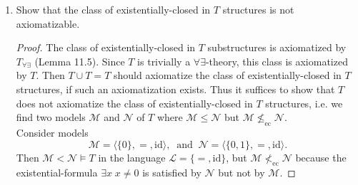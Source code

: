 \documentclass{article}
\begin{document}
\begin{enumerate}[label={\bf Q\arabic*:}]
\begin{enumerate}
      \item Show that the class of existentially-closed in $T$ structures
        is not axiomatizable.
        \begin{proof}
          The class of existentially-closed in $T$ substructures is
          axiomatized by $T_{\forall\exists}$ (Lemma 11.5). Since $T$ is
          trivially a $\forall\exists$-theory, this class is axiomatized by
          $T$. Then $T\cup T=T$ should axiomatize the class of
          existentially-closed in $T$ structures, if such an axiomatization
          exists. Thus it suffices to show that $T$ does not axiomatize the
          class of existentially-closed in $T$ structures, i.e. we find two
          models $\mathcal{M}$ and $\mathcal{N}$ of $T$ where
          $\mathcal{M}\leq\mathcal{N}$ but
          $\mathcal{M}\not\leq_{\text{ec}}\mathcal{N}$. \\

          Consider models
          \[\mathcal{M}= \langle\{0\},=,\text{id}\rangle,\;\;
            \text{and}\;\; \mathcal{N}=
            \langle\{0,1\},=,\text{id}\rangle.\]
          Then $\mathcal{M}<\mathcal{N}\models T$ in the language
          $\mathcal{L}=\{=,\text{id}\}$, but
          $\mathcal{M}\not<_{\text{ec}}\mathcal{N}$ because the
          existential-formula $\exists x\; x\neq 0$ is satisfied by
          $\mathcal{N}$ but not by $\mathcal{M}$.


        \end{proof}
    \end{enumerate}
\end{enumerate}
\end{document}
